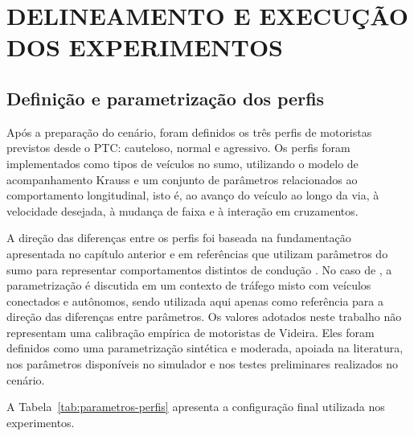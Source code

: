 \chapter{DELINEAMENTO E EXECUÇÃO DOS EXPERIMENTOS}

\section{Definição e parametrização dos perfis}

Após a preparação do cenário, foram definidos os três perfis de motoristas previstos desde o PTC: cauteloso, normal e agressivo. Os perfis foram implementados como tipos de veículos no \gls{sumo}, utilizando o modelo de acompanhamento Krauss e um conjunto de parâmetros relacionados ao comportamento longitudinal, isto é, ao avanço do veículo ao longo da via, à velocidade desejada, à mudança de faixa e à interação em cruzamentos.

A direção das diferenças entre os perfis foi baseada na fundamentação apresentada no capítulo anterior e em referências que utilizam parâmetros do \gls{sumo} para representar comportamentos distintos de condução \cite{mecheva_2022,camlica_2022,yavuz_2025}. No caso de , a parametrização é discutida em um contexto de tráfego misto com veículos conectados e autônomos, sendo utilizada aqui apenas como referência para a direção das diferenças entre parâmetros. Os valores adotados neste trabalho não representam uma calibração empírica de motoristas de Videira. Eles foram definidos como uma parametrização sintética e moderada, apoiada na literatura, nos parâmetros disponíveis no simulador e nos testes preliminares realizados no cenário.

A Tabela~\ref{tab:parametros-perfis} apresenta a configuração final utilizada nos experimentos.

